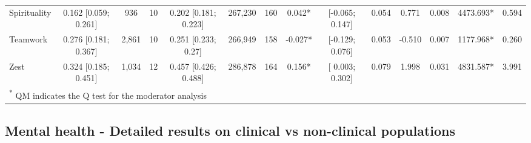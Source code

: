 \documentclass[
  man,floatsintext]{apa6}
\begin{document}
\begin{table}
{\begin{tabular}[t]{lccccccccccccc}
Spirituality & 0.162 [0.059; 0.261] & 936 & 10 & 0.202 [0.181; 0.223] & 267,230 & 160 & 0.042* & {}[-0.065; 0.147] & 0.054 & 0.771 & 0.008 & 4473.693* & 0.594\\
Teamwork & 0.276 [0.181; 0.367] & 2,861 & 10 & 0.251 [0.233; 0.27] & 266,949 & 158 & -0.027* & {}[-0.129; 0.076] & 0.053 & -0.510 & 0.007 & 1177.968* & 0.260\\
Zest & 0.324 [0.185; 0.451] & 1,034 & 12 & 0.457 [0.426; 0.488] & 286,878 & 164 & 0.156* & {}[ 0.003; 0.302] & 0.079 & 1.998 & 0.031 & 4831.587* & 3.991\\
\bottomrule
\multicolumn{14}{l}{\textsuperscript{*} QM indicates the Q test for the moderator analysis}\\
\end{tabular}}
\end{table}

\newpage

\hypertarget{mental-health---detailed-results-on-clinical-vs-non-clinical-populations}{%
\subsection{Mental health - Detailed results on clinical vs non-clinical populations}\label{mental-health---detailed-results-on-clinical-vs-non-clinical-populations}}
\end{document}
